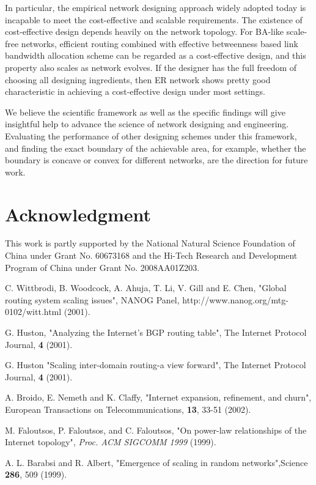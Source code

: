 \documentclass[journal]{IEEEtran}
\begin{document}
{In particular, the empirical network designing approach widely
adopted today is incapable to meet the cost-effective and scalable
requirements. The existence of cost-effective design depends heavily
on the network topology. For BA-like scale-free networks, efficient
routing combined with effective betweenness based link bandwidth
allocation scheme can be regarded as a cost-effective design, and
this property also scales as network evolves. If the designer has
the full freedom of choosing all designing ingredients, then ER
network shows pretty good characteristic in achieving a
cost-effective design under most settings.

We believe the scientific framework as well as the specific findings
will give insightful help to advance the science of network
designing and engineering. Evaluating the performance of other
designing schemes under this framework, and finding the exact
boundary of the achievable area, for example, whether the boundary
is concave or convex for different networks, are the direction for
future work.
\section*{Acknowledgment}
This work is partly supported by the National Natural Science
Foundation of China under Grant No. 60673168 and the Hi-Tech
Research and Development Program of China under Grant No.
2008AA01Z203.


 \begin{thebibliography}{5}

 C. Wittbrodi, B. Woodcock, A. Ahuja, T.
Li, V. Gill and E. Chen, "Global routing system scaling issues",
NANOG Panel, http://www.nanog.org/mtg-0102/witt.html (2001).

 G. Huston, "Analyzing the Internet's BGP routing
table", The Internet Protocol Journal, {\bf 4} (2001).

 G. Huston "Scaling inter-domain routing-a view
forward", The Internet Protocol Journal, {\bf 4} (2001).

 A. Broido, E. Nemeth and K. Claffy, "Internet
expansion, refinement, and churn", European Transactions on
Telecommunications, {\bf 13}, 33-51 (2002).


 M. Faloutsos, P. Faloutsos, and C. Faloutsos,
"On power-law relationships of the Internet topology", \emph{Proc.
ACM SIGCOMM 1999} (1999).

 A. L. Barabsi and R. Albert, "Emergence of scaling in random networks",Science {\bf 286}, 509
(1999).


\end{thebibliography}}
\end{document}
